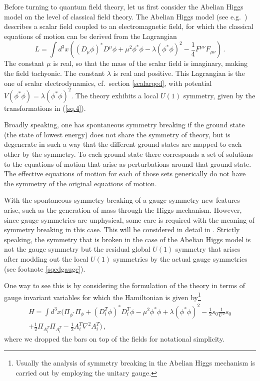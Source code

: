 \documentclass[12pt]{article}
\begin{document}
Before turning to quantum field theory, let us first consider the Abelian Higgs model on the level of classical field theory. The Abelian Higgs model (see e.g.\ \cite{abers73}) describes a scalar field coupled to an electromagnetic field, for which the classical equations of motion can be derived from the Lagrangian
\begin{equation}
L =  \int d^3 x \left((D_{\mu} \phi)^* D^{\mu} \phi   + \mu^2\phi^*\phi - \lambda(\phi^*\phi)^2 - \frac{1}{4} F^{\mu \nu}F_{\mu \nu} \right) \,.
\label{h.1}
\end{equation}
The constant $\mu$ is real, so that the mass of the scalar field is imaginary, making the field tachyonic. The constant $\lambda$ is real and positive. This Lagrangian is the one of scalar electrodynamics, cf.\ section \ref{scalarqed}, with potential $V(\phi^*\phi)=\lambda(\phi^*\phi)^2$. The theory exhibits a local $U(1)$ symmetry, given by the transformations in (\ref{sq.4}).

Broadly speaking, one has spontaneous symmetry breaking if the ground state (the state of lowest energy) does not share the symmetry of theory, but is degenerate in such a way that the different ground states are mapped to each other by the symmetry. To each ground state there corresponds a set of solutions to the equations of motion that arise as perturbations around that ground state. The effective equations of motion for each of those sets generically do not have the symmetry of the original equations of motion.

With the spontaneous symmetry breaking of a gauge symmetry new features arise, such as the generation of mass through the Higgs mechanism. However, since gauge symmetries are unphysical, some care is required with the meaning of symmetry breaking in this case. This will be considered in detail in \cite{struyve09c}. Strictly speaking, the symmetry that is broken in the case of the Abelian Higgs model is not the gauge symmetry but the residual global $U(1)$ symmetry that arises after modding out the local $U(1)$ symmetries by the actual gauge symmetries (see footnote \ref{sqedgauge}). 

One way to see this is by considering the formulation of the theory in terms of gauge invariant variables for which the Hamiltonian is given by{\footnote{Usually the analysis of symmetry breaking in the Abelian Higgs mechanism is carried out by employing the unitary gauge.}}
\begin{multline}
H = \int d^3 x \bigg(\Pi_{{\phi}^*} \Pi_{ \phi} + \left(D^T_{i}  \phi  \right)^{*}  D^T_{i}  \phi -  \mu^2\phi^*\phi + \lambda(\phi^*\phi)^2   -\frac{1}{2}  s_0  \frac{1}{\nabla^2} s_0   \\
 +  \frac{1}{2} \Pi_{A^T_i}\Pi_{A^T_i} - \frac{1}{2} A^T_i \nabla^2 A^T_i \bigg)\,, 
\label{h.2}
\end{multline}
where we dropped the bars on top of the fields for notational simplicity. 
\end{document}
